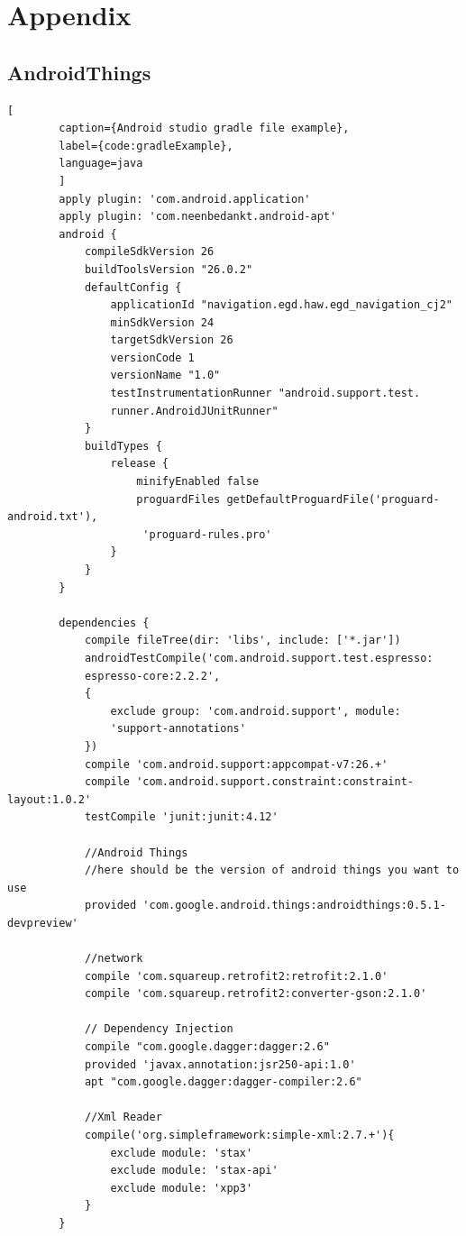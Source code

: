 \chapter{Appendix}
    \section{AndroidThings}
    \begin{lstlisting}[
        caption={Android studio gradle file example},
        label={code:gradleExample},
        language=java
        ]
        apply plugin: 'com.android.application'
        apply plugin: 'com.neenbedankt.android-apt'
        android {
            compileSdkVersion 26
            buildToolsVersion "26.0.2"
            defaultConfig {
                applicationId "navigation.egd.haw.egd_navigation_cj2"
                minSdkVersion 24
                targetSdkVersion 26
                versionCode 1
                versionName "1.0"
                testInstrumentationRunner "android.support.test.
                runner.AndroidJUnitRunner"
            }
            buildTypes {
                release {
                    minifyEnabled false
                    proguardFiles getDefaultProguardFile('proguard-android.txt'),
                     'proguard-rules.pro'
                }
            }
        }
        
        dependencies {
            compile fileTree(dir: 'libs', include: ['*.jar'])
            androidTestCompile('com.android.support.test.espresso:
            espresso-core:2.2.2', 
            {
                exclude group: 'com.android.support', module: 
                'support-annotations'
            })
            compile 'com.android.support:appcompat-v7:26.+'
            compile 'com.android.support.constraint:constraint-layout:1.0.2'
            testCompile 'junit:junit:4.12'
        
            //Android Things
            //here should be the version of android things you want to use
            provided 'com.google.android.things:androidthings:0.5.1-devpreview'
        
            //network
            compile 'com.squareup.retrofit2:retrofit:2.1.0'
            compile 'com.squareup.retrofit2:converter-gson:2.1.0'
        
            // Dependency Injection
            compile "com.google.dagger:dagger:2.6"
            provided 'javax.annotation:jsr250-api:1.0'
            apt "com.google.dagger:dagger-compiler:2.6"
        
            //Xml Reader
            compile('org.simpleframework:simple-xml:2.7.+'){
                exclude module: 'stax'
                exclude module: 'stax-api'
                exclude module: 'xpp3'
            }
        }
         
    \end{lstlisting} 

